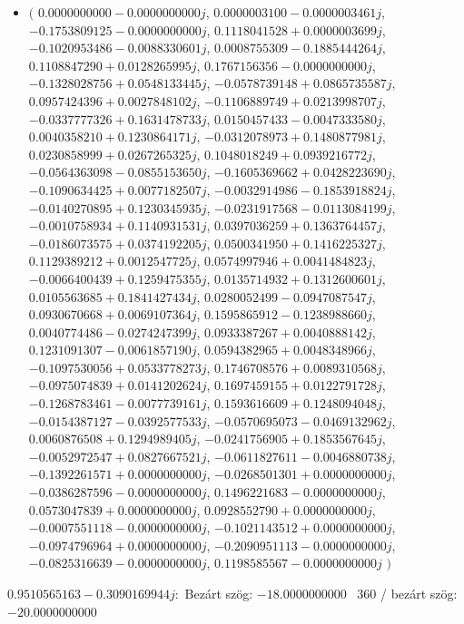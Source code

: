 \documentclass[14pt,a4paper]{article}
\begin{document}
\begin{itemize}
\item
$\big($
$0.0000000000-0.0000000000j$, $0.0000003100-0.0000003461j$, $-0.1753809125-0.0000000000j$, $0.1118041528+0.0000003699j$, $-0.1020953486-0.0088330601j$, $0.0008755309-0.1885444264j$, $0.1108847290+0.0128265995j$, $0.1767156356-0.0000000000j$, $-0.1328028756+0.0548133445j$, $-0.0578739148+0.0865735587j$, $0.0957424396+0.0027848102j$, $-0.1106889749+0.0213998707j$, $-0.0337777326+0.1631478733j$, $0.0150457433-0.0047333580j$, $0.0040358210+0.1230864171j$, $-0.0312078973+0.1480877981j$, $0.0230858999+0.0267265325j$, $0.1048018249+0.0939216772j$, $-0.0564363098-0.0855153650j$, $-0.1605369662+0.0428223690j$, $-0.1090634425+0.0077182507j$, $-0.0032914986-0.1853918824j$, $-0.0140270895+0.1230345935j$, $-0.0231917568-0.0113084199j$, $-0.0010758934+0.1140931531j$, $0.0397036259+0.1363764457j$, $-0.0186073575+0.0374192205j$, $0.0500341950+0.1416225327j$, $0.1129389212+0.0012547725j$, $0.0574997946+0.0041484823j$, $-0.0066400439+0.1259475355j$, $0.0135714932+0.1312600601j$, $0.0105563685+0.1841427434j$, $0.0280052499-0.0947087547j$, $0.0930670668+0.0069107364j$, $0.1595865912-0.1238988660j$, $0.0040774486-0.0274247399j$, $0.0933387267+0.0040888142j$, $0.1231091307-0.0061857190j$, $0.0594382965+0.0048348966j$, $-0.1097530056+0.0533778273j$, $0.1746708576+0.0089310568j$, $-0.0975074839+0.0141202624j$, $0.1697459155+0.0122791728j$, $-0.1268783461-0.0077739161j$, $0.1593616609+0.1248094048j$, $-0.0154387127-0.0392577533j$, $-0.0570695073-0.0469132962j$, $0.0060876508+0.1294989405j$, $-0.0241756905+0.1853567645j$, $-0.0052972547+0.0827667521j$, $-0.0611827611-0.0046880738j$, $-0.1392261571+0.0000000000j$, $-0.0268501301+0.0000000000j$, $-0.0386287596-0.0000000000j$, $0.1496221683-0.0000000000j$, $0.0573047839+0.0000000000j$, $0.0928552790+0.0000000000j$, $-0.0007551118-0.0000000000j$, $-0.1021143512+0.0000000000j$, $-0.0974796964+0.0000000000j$, $-0.2090951113-0.0000000000j$, $-0.0825316639-0.0000000000j$, $0.1198585567-0.0000000000j$
$\big)$
\end{itemize}
$0.9510565163-0.3090169944j$:\
Bezárt szög: $-18.0000000000$ \
360 / bezárt szög: $-20.0000000000$\
\end{document}
